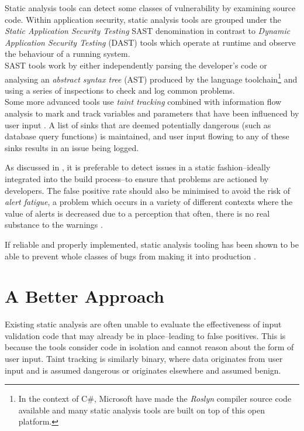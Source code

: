 \documentclass[a4paper,openany,12pt]{book}
\begin{document}
Static analysis tools can detect some classes of vulnerability by examining source code. Within application security, static analysis tools are grouped under the \emph{Static Application Security Testing} SAST denomination in contrast to \emph{Dynamic Application Security Testing} (DAST) tools which operate at runtime and observe the behaviour of a running system.\\SAST tools work by either independently parsing the developer's code or analysing an \emph{abstract syntax tree} (AST) produced by the language toolchain\footnote{In the context of C\#, Microsoft have made the \emph{Roslyn} compiler source code available and many static analysis tools are built on top of this open platform.} and using a series of inspections to check and log common problems.\\Some more advanced tools use \emph{taint tracking} combined with information flow analysis to mark and track variables and parameters that have been influenced by user input \citep{denning1977certification}. A list of sinks that are deemed potentially dangerous (such as database query functions) is maintained, and user input flowing to any of these sinks results in an issue being logged.

As discussed in \citet{sadowski2018lessons}, it is preferable to detect issues in a static fashion--ideally integrated into the build process--to ensure that problems are actioned by developers. The false positive rate should also be minimised to avoid the risk of \emph{alert fatigue}, a problem which occurs in a variety of different contexts where the value of alerts is decreased due to a perception that often, there is no real substance to the warnings \citep{kesselheim2011clinical}.

If reliable and properly implemented, static analysis tooling has been shown to be able to prevent whole classes of bugs from making it into production \citep{sadowski2018lessons}.

\section{A Better Approach}

Existing static analysis are often unable to evaluate the effectiveness of input validation code that may already be in place--leading to false positives. This is because the tools consider code in isolation and cannot reason about the form of user input. Taint tracking is similarly binary, where data originates from user input and is assumed dangerous or originates elsewhere and assumed benign.
\end{document}
